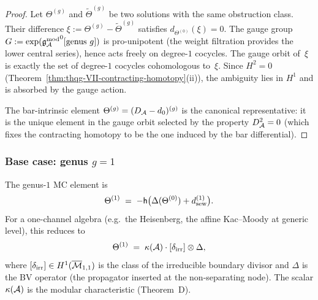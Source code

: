 \begin{proof}
Let $\Theta^{(g)}$ and $\widetilde{\Theta}^{(g)}$ be two
solutions with the same obstruction class. Their difference
$\xi := \Theta^{(g)} - \widetilde{\Theta}^{(g)}$ satisfies
$d_{\Theta^{(0)}}(\xi) = 0$. The gauge group
$G := \exp({\mathfrak{g}_{\mathcal{A}}^{\mathrm{mod}}}^0[\text{genus }g])$ is pro-unipotent
(the weight filtration provides the lower central series), hence
acts freely on degree-$1$ cocycles. The gauge orbit of~$\xi$
is exactly the set of degree-$1$ cocycles cohomologous to~$\xi$.
Since $H^2 = 0$
(Theorem~\ref{thm:thqg-VII-contracting-homotopy}(ii)),
the ambiguity lies in $H^1$ and is absorbed by the gauge action.

The bar-intrinsic element $\Theta^{(g)} = (D_{\mathcal{A}} - d_0)^{(g)}$
is the canonical representative: it is the unique element in
the gauge orbit selected by the property $D_{\mathcal{A}}^2 = 0$ (which
fixes the contracting homotopy to be the one induced by the
bar differential).
\end{proof}

\subsubsection{Base case: genus $g = 1$}
\label{subsubsec:thqg-VII-base-case}

\begin{proposition}
\label{prop:thqg-VII-genus1-solution}
The genus-$1$ MC element is
\begin{equation}\label{eq:thqg-VII-theta1}
\Theta^{(1)}
\;=\;
-\mathsf{h}\bigl(
\Delta(\Theta^{(0)}) + d_{\mathrm{sew}}^{(1)}
\bigr).
\end{equation}
For a one-channel algebra (e.g.\ the Heisenberg, the affine
Kac--Moody at generic level), this reduces to
\begin{equation}\label{eq:thqg-VII-theta1-scalar}
\Theta^{(1)}
\;=\;
\kappa(\mathcal{A}) \cdot [\delta_{\mathrm{irr}}] \otimes \Delta,
\end{equation}
where $[\delta_{\mathrm{irr}}] \in H^1(\overline{\mathcal{M}}_{1,1})$
is the class of the irreducible boundary divisor and $\Delta$ is
the BV operator (the propagator inserted at the non-separating
node). The scalar $\kappa(\mathcal{A})$ is the modular characteristic
\textup{(}Theorem~D\textup{)}.
\end{proposition}

